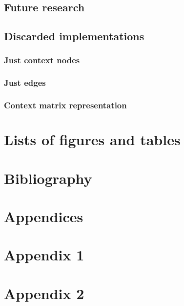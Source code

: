 \documentclass{article}
\begin{document}
  
 \subsection{Future research}
 
 
 \subsection{Discarded implementations}

  \subsubsection{Just context nodes}
  
  \subsubsection{Just edges}
  
  \subsubsection{Context matrix representation}
 
 \section{Lists of figures and tables}
 
 \newpage
 \listoffigures
 \listoftables
 
 \section{Bibliography} %
 
 \newpage
 
 {}
 
 
 \newpage
 \section{Appendices}
 \begin{appendices}
  \section*{Appendix 1}
  \section*{Appendix 2}
 \end{appendices}
 
 
\end{document}
